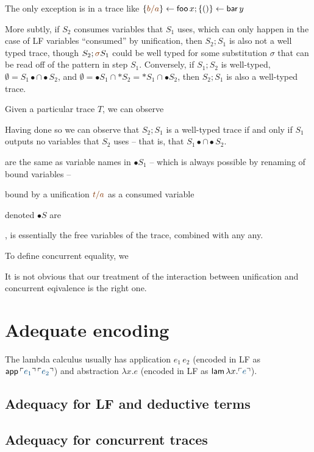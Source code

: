 The only exception
is in a trace like $\trstep{\lf{b/a}}{\sf foo}\,x; \trstep{()}{\sf bar}\,y$


 More subtly, if
$S_2$ consumes variables that $S_1$ uses, which can only happen in the
case of LF variables ``consumed'' by unification, then $S_2; S_1$ is
also not a well typed trace, though $S_2; \lf{\sigma}S_1$ could be
well typed for some substitution $\sigma$ that can be read off of the
pattern in step $S_1$. Conversely, if $S_1; S_2$ is well-typed,
$\emptyset = S_1{\bullet} \cap {\bullet}S_2$, and $\emptyset =
{\bullet}S_1 \cap {\ast}S_2 = {\ast}S_1 \cap {\bullet}S_2$, then $S_2;
S_1$ is also a well-typed trace.

Given a particular trace $T$, we can observe 

Having done so we can observe that $S_2; S_1$ is a
well-typed trace if and only if $S_1$ outputs no variables
that $S_2$ uses -- that is, that $S_1{\bullet} \cap {\bullet}S_2$.

are the same as variable
names in ${\bullet}S_1$ -- which is always possible by renaming of
bound variables --

bound by
a unification $\lf{t/a}$ as a consumed variable


 denoted ${\bullet}S$
are 

, is 
essentially the free variables of the trace, combined with any any. 


To define concurrent equality, we 

It is not obvious that our treatment of the interaction between 
unification and concurrent eqivalence is the right one. 

\section{Adequate encoding}

The lambda
calculus usually has application $e_1\,e_2$ (encoded in LF as ${\sf
  app}\,\interp{e_1}\,\interp{e_2}$) and abstraction $\lambda x.e$
(encoded in LF as ${\sf lam}\,\lambda x. \interp{e}$). 

\subsection{Adequacy for LF and deductive terms}

\subsection{Adequacy for concurrent traces}


